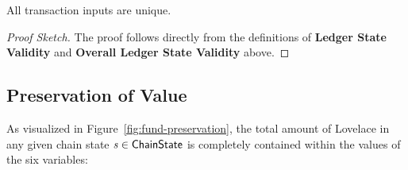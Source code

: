 \begin{property}
  All transaction inputs are unique.
  \label{prop:ledger-properties-no-double-spend}
\end{property}

\noindent
\begin{proof}[Proof Sketch]
  The proof follows directly from the definitions of \textbf{Ledger State Validity} and \textbf{Overall Ledger State Validity} above.
\end{proof}



\subsection{Preservation of Value}
\label{sec:preservation-of-value}

As visualized in Figure~\ref{fig:fund-preservation},
the total amount of Lovelace in any given chain state
$\mathit{s}\in\mathsf{ChainState}$ is completely contained within the values of the six
variables:\\[1em]

